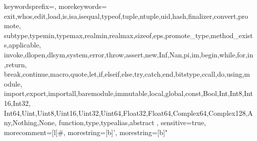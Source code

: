 \newcommand{\beq}{\begin{equation}}
\newcommand{\eeq}{\end{equation}}

\newcommand{\red}[1]{\color{red}{#1}}

\newcommand{\mref}{{\color{red}0.0}} %
\newcommand{\todo}{{\color{tabred}[To be continued\dots]}}




{
  keywordsprefix=\@,
  morekeywords={
    exit,whos,edit,load,is,isa,isequal,typeof,tuple,ntuple,uid,hash,finalizer,convert,promote,
    subtype,typemin,typemax,realmin,realmax,sizeof,eps,promote_type,method_exists,applicable,
    invoke,dlopen,dlsym,system,error,throw,assert,new,Inf,Nan,pi,im,begin,while,for,in,return,
    break,continue,macro,quote,let,if,elseif,else,try,catch,end,bitstype,ccall,do,using,module,
    import,export,importall,baremodule,immutable,local,global,const,Bool,Int,Int8,Int16,Int32,
    Int64,Uint,Uint8,Uint16,Uint32,Uint64,Float32,Float64,Complex64,Complex128,Any,Nothing,None,
    function,type,typealias,abstract
  },
  sensitive=true,
  morecomment=[l]{\#},
  morestring=[b]',
  morestring=[b]" 
}

